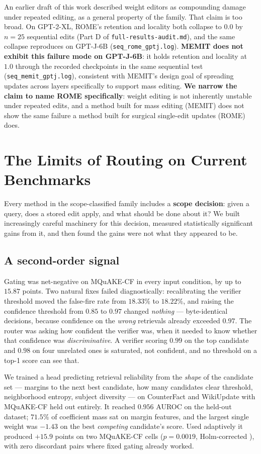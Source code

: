 \documentclass[11pt]{article}
\begin{document}
An earlier draft of this work described weight editors as compounding
damage under repeated editing, as a general property of the family. That
claim is too broad. On GPT-2-XL, ROME's retention and locality both collapse
to $0.0$ by $n{=}25$ sequential edits (Part D of
\texttt{full-results-audit.md}), and the same collapse reproduces on GPT-J-6B
(\texttt{seq\_rome\_gptj.log}). \textbf{MEMIT does not exhibit this failure
mode on GPT-J-6B}: it holds retention and locality at $1.0$ through the
recorded checkpoints in the same sequential test
(\texttt{seq\_memit\_gptj.log}), consistent with MEMIT's design goal of
spreading updates across layers specifically to support mass editing.
\textbf{We narrow the claim to name ROME specifically}: weight editing is not
inherently unstable under repeated edits, and a method built for mass
editing (MEMIT) does not show the same failure a method built for surgical
single-edit updates (ROME) does.

\section{The Limits of Routing on Current Benchmarks}
\label{sec:headroom}

Every method in the scope-classified family includes a \textbf{scope
decision}: given a query, does a stored edit apply, and what should be done
about it? We built increasingly careful machinery for this decision,
measured statistically significant gains from it, and then found the gains
were not what they appeared to be.

\subsection{A second-order signal}
\label{sec:secondorder}
Gating was net-negative on MQuAKE-CF in every input condition, by up to
$15.87$ points. Two natural fixes failed diagnostically: recalibrating the
verifier threshold moved the false-fire rate from $18.33\%$ to $18.22\%$, and
raising the confidence threshold from $0.85$ to $0.97$ changed
\emph{nothing} --- byte-identical decisions, because confidence on the
\emph{wrong} retrievals already exceeded $0.97$. The router was asking how
confident the verifier was, when it needed to know whether that confidence
was \emph{discriminative}. A verifier scoring $0.99$ on the top candidate and
$0.98$ on four unrelated ones is saturated, not confident, and no threshold
on a top-1 score can see that.

We trained a head predicting retrieval reliability from the \emph{shape} of
the candidate set --- margins to the next best candidate, how many
candidates clear threshold, neighborhood entropy, subject diversity --- on
CounterFact and WikiUpdate with MQuAKE-CF held out entirely. It reached
$0.956$ AUROC on the held-out dataset; $71.5\%$ of coefficient mass sat on
margin features, and the largest single weight was $-1.43$ on the best
\emph{competing} candidate's score. Used adaptively it produced $+15.9$
points on two MQuAKE-CF cells ($p{=}0.0019$, Holm-corrected
\citep{holm1979}), with zero discordant pairs where fixed gating already
worked.
\end{document}
